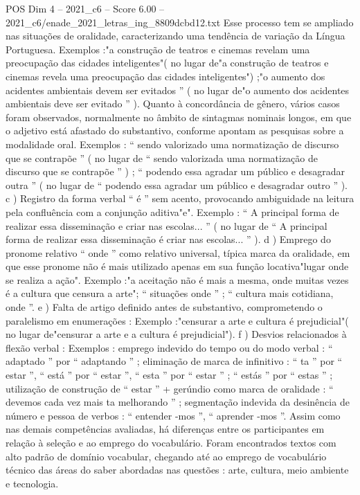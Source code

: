 \begin{textsample}{POS Dim 4 – 2021\_c6 – Score 6.00 – 2021\_c6/enade\_2021\_letras\_ing\_8809dcbd12.txt}
Esse processo tem se ampliado nas situações de oralidade, caracterizando uma tendência de variação da Língua Portuguesa.
Exemplos :"a construção de teatros e cinemas revelam uma preocupação das cidades inteligentes"( no lugar de"a construção de teatros e cinemas revela uma preocupação das cidades inteligentes") ;"o aumento dos acidentes ambientais devem ser evitados ” ( no lugar de"o aumento dos acidentes ambientais deve ser evitado ” ).
Quanto à concordância de gênero, vários casos foram observados, normalmente no âmbito de sintagmas nominais longos, em que o adjetivo está afastado do substantivo, conforme apontam as pesquisas sobre a modalidade oral.
Exemplos : “ sendo valorizado uma normatização de discurso que se contrapõe ” ( no lugar de “ sendo valorizada uma normatização de discurso que se contrapõe ” ) ; “ podendo essa agradar um público e desagradar outra ” ( no lugar de “ podendo essa agradar um público e desagradar outro ” ). c ) Registro da forma verbal “ é ” sem acento, provocando ambiguidade na leitura pela confluência com a conjunção aditiva"e".
Exemplo : “ A principal forma de realizar essa disseminação e criar nas escolas... ” ( no lugar de “ A principal forma de realizar essa disseminação é criar nas escolas... ” ). d ) Emprego do pronome relativo “ onde ” como relativo universal, típica marca da oralidade, em que esse pronome não é mais utilizado apenas em sua função locativa"lugar onde se realiza a ação".
Exemplo :"a aceitação não é mais a mesma, onde muitas vezes é a cultura que censura a arte"; “ situações onde ” ; “ cultura mais cotidiana, onde ”. e ) Falta de artigo definido antes de substantivo, comprometendo o paralelismo em enumerações : Exemplo :"censurar a arte e cultura é prejudicial"( no lugar de"censurar a arte e a cultura é prejudicial"). f ) Desvios relacionados à flexão verbal : Exemplos : emprego indevido do tempo ou do modo verbal : “ adaptado ” por “ adaptando ” ; eliminação de marca de infinitivo : “ ta ” por “ estar ”, “ está ” por “ estar ”, “ esta ” por “ estar ” ; “ estás ” por “ estas ” ; utilização de construção de “ estar ” + gerúndio como marca de oralidade : “ devemos cada vez mais ta melhorando ” ; segmentação indevida da desinência de número e pessoa de verbos : “ entender -mos ”, “ aprender -mos ”.
Assim como nas demais competências avaliadas, há diferenças entre os participantes em relação à seleção e ao emprego do vocabulário.
Foram encontrados textos com alto padrão de domínio vocabular, chegando até ao emprego de vocabulário técnico das áreas do saber abordadas nas questões : arte, cultura, meio ambiente e tecnologia.

\end{textsample}
